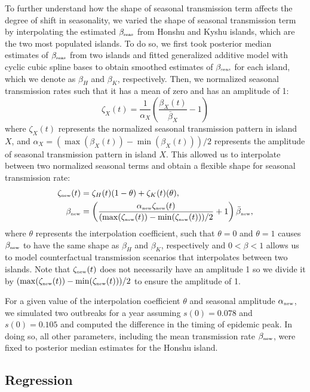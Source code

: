 \documentclass[12pt]{article}
\newcommand{\tsub}[2]{#1_{{\textrm{\tiny #2}}}}
\begin{document}
To further understand how the shape of seasonal transmission term affects the degree of shift in seasonality, we varied the shape of seasonal transmission term by interpolating the estimated $\tsub{\beta}{seas}$ from Honshu and Kyshu islands, which are the two most populated islands. 
To do so, we first took posterior median estimates of $\tsub{\beta}{seas}$ from two islands and fitted generalized additive model with cyclic cubic spline bases to obtain smoothed estimates of $\tsub{\beta}{seas}$ for each island, which we denote as $\beta_H$ and $\beta_K$, respectively.
Then, we normalized seasonal transmission rates such that it has a mean of zero and has an amplitude of 1:
\begin{equation}
\zeta_X(t) = \frac{1}{\alpha_X} \left(\frac{\beta_{X}(t)}{\bar{\beta}_X} - 1\right)
\end{equation}
where $\zeta_X(t)$ represents the normalized seasonal transmission pattern in island $X$,
and $\alpha_X = (\max(\beta_X(t)) - \min(\beta_X(t)))/2$ represents the amplitude of seasonal transmission pattern in island $X$.
This allowed us to interpolate between two normalized seasonal terms and obtain a flexible shape for seasonal transmission rate:
\begin{align}
\tsub{\zeta}{new}(t) &= \zeta_H(t) (1-\theta) + \zeta_K(t)(\theta),\\
\tsub{\beta}{new} &= \left(\frac{\tsub{\alpha}{new} \tsub{\zeta}{new}(t)}{(\max(\tsub{\zeta}{new}(t))-\min(\tsub{\zeta}{new}(t)))/2} + 1\right) \tsub{\bar{\beta}}{new},
\end{align}
where $\theta$ represents the interpolation coefficient, such that $\theta=0$ and $\theta=1$ causes $\tsub{\beta}{new}$ to have the same shape as $\beta_H$ and $\beta_K$, respectively and $0 < \beta < 1$ allows us to model counterfactual transmission scenarios that interpolates between two islands.
Note that $\tsub{\zeta}{new}(t)$ does not necessarily have an amplitude 1 so we divide it by $(\max(\tsub{\zeta}{new}(t))-\min(\tsub{\zeta}{new}(t)))/2$ to ensure the amplitude of 1.

For a given value of the interpolation coefficient $\theta$ and seasonal amplitude $\tsub{\alpha}{new}$, we simulated two outbreaks for a year assuming $s(0) = 0.078$ and $s(0)=0.105$ and computed the difference in the timing of epidemic peak.
In doing so, all other parameters, including the mean transmission rate $\tsub{\beta}{new}$, were fixed to posterior median estimates for the Honshu island. 

\subsection*{Regression}
\end{document}
